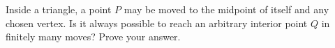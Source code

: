 Inside a triangle, a point $P$ may be moved to the midpoint of itself and any chosen vertex. Is it always possible to reach an arbitrary interior point $Q$ in finitely many moves? Prove your answer.
